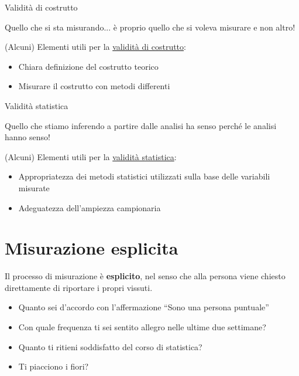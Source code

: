 \documentclass[compress]{beamer}
\begin{document}
\begin{frame}
	
	\begin{block}{Validità di costrutto}
		
		Quello che si sta misurando... è proprio quello che si voleva misurare e non altro!
		
		(Alcuni) Elementi utili per la \underline{validità di costrutto}:
		\begin{itemize}
			\item Chiara definizione del costrutto teorico
			\item Misurare il costrutto con metodi differenti
		\end{itemize} 
	\end{block}	
	
	\begin{block}{Validità statistica}
		
		Quello che stiamo inferendo a partire dalle analisi ha senso perché le analisi hanno senso! 
		
		(Alcuni) Elementi utili per la \underline{validità statistica}:
		\begin{itemize}
			\item Appropriatezza dei metodi statistici utilizzati sulla base delle variabili misurate
			\item Adeguatezza dell'ampiezza campionaria
		\end{itemize} 
		
	\end{block}
\end{frame}


\section[Mis. esplicita]{Misurazione esplicita}

\begin{frame}
	Il processo di misurazione è \textbf{esplicito}, nel senso che alla persona viene chiesto direttamente di riportare i propri vissuti.
	
	\begin{exampleblock}{}
		
		\begin{itemize}
			\item Quanto sei d'accordo con l'affermazione ``Sono una persona puntuale''
			\item Con quale frequenza ti sei sentito allegro nelle ultime due settimane? 
			\item Quanto ti ritieni soddisfatto del corso di statistica? 
			\item Ti piacciono i fiori?
		\end{itemize}
	\end{exampleblock}
\end{frame}
\end{document}
